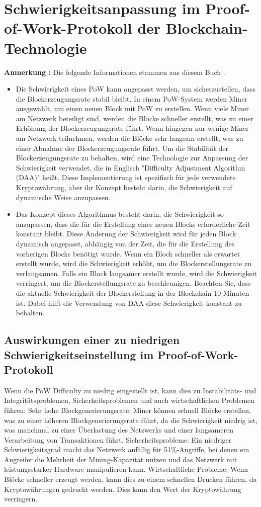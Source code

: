 \section{Schwierigkeitsanpassung im Proof-of-Work-Protokoll der Blockchain-Technologie}
\textbf{Anmerkung :} Die folgende Informationen stammen aus diesem Buch \cite{lewis2018basics}.
\begin{itemize}
	\item Die Schwierigkeit eines PoW kann angepasst werden, um sicherzustellen, dass die Blockerzeugungsrate stabil bleibt. In einem PoW-System werden Miner ausgewählt, um einen neuen Block mit PoW zu erstellen. Wenn viele Miner am Netzwerk beteiligt sind, werden die Blöcke schneller erstellt, was zu einer Erhöhung der Blockerzeugungsrate führt. Wenn hingegen nur wenige Miner am Netzwerk teilnehmen, werden die Blöcke sehr langsam erstellt, was zu einer Abnahme der Blockerzeugungsrate führt. Um die Stabilität der Blockerzeugungsrate zu behalten, wird eine Technologie zur Anpassung der Schwierigkeit verwendet, die in Englisch "Difficulty Adjustment Algorithm (DAA)" heißt. Diese Implementierung ist spezifisch für jede verwendete Kryptowährung, aber ihr Konzept besteht darin, die Schwierigkeit auf dynamische Weise anzupassen. 
	
	\item Das Konzept dieses Algorithmus besteht darin, die Schwierigkeit so anzupassen, dass die für die Erstellung eines neuen Blocks erforderliche Zeit konstant bleibt. Diese Änderung der Schwierigkeit wird für jeden Block dynamisch angepasst, abhängig von der Zeit, die für die Erstellung des vorherigen Blocks benötigt wurde. Wenn ein Block schneller als erwartet erstellt wurde, wird die Schwierigkeit erhöht, um die Blockerstellungsrate zu verlangsamen. Falls ein Block langsamer erstellt wurde, wird die Schwierigkeit verringert, um die Blockerstellungsrate zu beschleunigen. Beachten Sie, dass die aktuelle Schwierigkeit der Blockerstellung in der Blockchain 10 Minuten ist. Dabei hilft die Verwendung von DAA diese Schwierigkeit konstant zu behalten.
\end{itemize}
\subsection{Auswirkungen einer zu niedrigen Schwierigkeitseinstellung im Proof-of-Work-Protokoll}
Wenn die PoW Difficulty zu niedrig eingestellt ist, kann dies zu Instabilitäts- und Integritätsproblemen, Sicherheitsproblemen und auch wirtschaftlichen Problemen führen:
Sehr hohe Blockgenerierungsrate: Miner können schnell Blöcke erstellen, was zu einer höheren Blockgenerierungsrate führt, da die Schwierigkeit niedrig ist, was manchmal zu einer Überlastung des Netzwerks und einer langsameren Verarbeitung von Transaktionen führt.
Sicherheitsprobleme: Ein niedriger Schwierigkeitsgrad macht das Netzwerk anfällig für 51\%-Angriffe, bei denen ein Angreifer die Mehrheit der Mining-Kapazität nutzen und das Netzwerk mit leistungsstarker Hardware manipulieren kann. 
Wirtschaftliche Probleme: Wenn Blöcke schneller erzeugt werden, kann dies zu einem schnellen Drucken führen, da Kryptowährungen gedruckt werden. Dies kann den Wert der Kryptowährung verringern.
